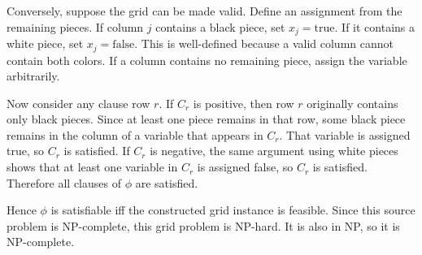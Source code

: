 {Conversely, suppose the grid can be made valid. Define an assignment from the
remaining pieces. If column $j$ contains a black piece, set
$x_j=\mathrm{true}$. If it contains a white piece, set $x_j=\mathrm{false}$.
This is well-defined because a valid column cannot contain both colors. If a
column contains no remaining piece, assign the variable arbitrarily.

Now consider any clause row $r$. If $C_r$ is positive, then row $r$ originally
contains only black pieces. Since at least one piece remains in that row, some
black piece remains in the column of a variable that appears in $C_r$. That
variable is assigned true, so $C_r$ is satisfied. If $C_r$ is negative, the same
argument using white pieces shows that at least one variable in $C_r$ is
assigned false, so $C_r$ is satisfied. Therefore all clauses of $\phi$ are
satisfied.

Hence $\phi$ is satisfiable iff the constructed grid instance is feasible. Since
this source problem is NP-complete, this grid problem is NP-hard. It is also in
NP, so it is NP-complete.
}
